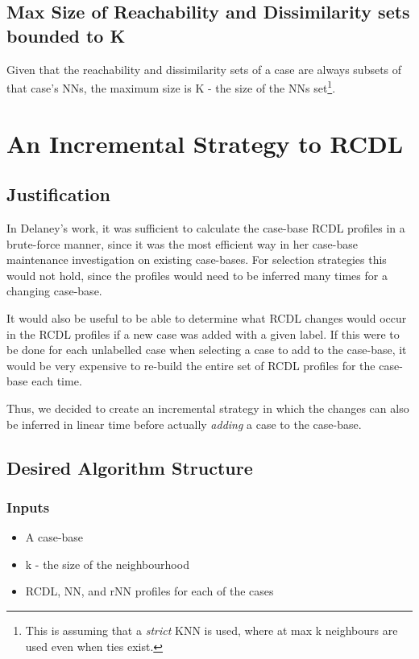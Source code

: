 \documentclass[a4paper,11pt]{report}
\begin{document}
\subsection{Max Size of Reachability and Dissimilarity sets bounded to K}
Given that the reachability and dissimilarity sets of a case are always subsets of that case's NNs, the maximum size is K - the size of the NNs set\footnote{This is assuming that a \emph{strict} KNN is used, where at max k neighbours are used even when ties exist.}.

\section{An Incremental Strategy to RCDL}
\subsection{Justification} 
In Delaney's work, it was sufficient to calculate the case-base RCDL profiles in a brute-force manner, since it was the most efficient way in her case-base maintenance investigation on existing case-bases. For selection strategies this would not hold, since the profiles would need to be inferred many times for a changing case-base.

It would also be useful to be able to determine what RCDL changes would occur in the RCDL profiles if a new case was added with a given label. If this were to be done for each unlabelled case when selecting a case to add to the case-base, it would be very expensive to re-build the entire set of RCDL profiles for the case-base each time.

Thus, we decided to create an incremental strategy in which the changes can also be inferred in linear time before actually \emph{adding} a case to the case-base.

\subsection{Desired Algorithm Structure}
\subsubsection{Inputs}
\begin{itemize}
	\item A case-base 
	\item k - the size of the neighbourhood
	\item RCDL, NN, and rNN profiles for each of the cases
\end{itemize}
\end{document}
